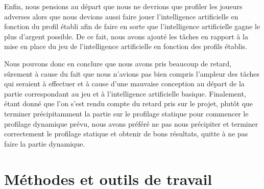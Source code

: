 \documentclass{report}
\begin{document}
Enfin, nous pensions au départ que nous ne devrions que profiler les joueurs adverses alors que nous devions aussi faire jouer l'intelligence artificielle en fonction du profil établi afin de faire en sorte que l'intelligence artificielle gagne le plus d'argent possible. De ce fait, nous avons ajouté les tâches en rapport à la mise en place du jeu de l'intelligence artificielle en fonction des profils établis. \par

Nous pouvons donc en conclure que nous avons pris beaucoup de retard, sûrement à cause du fait que nous n'avions pas bien compris l'ampleur des tâches qui seraient à effectuer et à cause d'une mauvaise conception au départ de la partie correspondant au jeu et à l'intelligence artificielle basique. Finalement, étant donné que l'on s'est rendu compte du retard pris sur le projet, plutôt que terminer précipitamment la partie sur le profilage statique pour commencer le profilage dynamique prévu, nous avons préféré ne pas nous précipiter et terminer correctement le profilage statique et obtenir de bons résultats, quitte à ne pas faire la partie dynamique. \par

\section{Méthodes et outils de travail}
\end{document}
